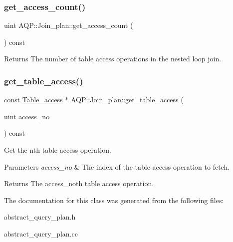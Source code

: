 \subsubsection{\texorpdfstring{get\+\_\+access\+\_\+count()}{get\_access\_count()}}
{\footnotesize\ttfamily uint A\+Q\+P\+::\+Join\+\_\+plan\+::get\+\_\+access\+\_\+count (\begin{DoxyParamCaption}{ }\end{DoxyParamCaption}) const\hspace{0.3cm}{\ttfamily [inline]}}

\begin{DoxyReturn}{Returns}
The number of table access operations in the nested loop join. 
\end{DoxyReturn}
\mbox{\label{classAQP_1_1Join__plan_aa9112ca023025f15a0b908f8cc519d18}} 
\subsubsection{\texorpdfstring{get\+\_\+table\+\_\+access()}{get\_table\_access()}}
{\footnotesize\ttfamily const \mbox{\hyperlink{classAQP_1_1Table__access}{Table\+\_\+access}} $\ast$ A\+Q\+P\+::\+Join\+\_\+plan\+::get\+\_\+table\+\_\+access (\begin{DoxyParamCaption}\item[{uint}]{access\+\_\+no }\end{DoxyParamCaption}) const\hspace{0.3cm}{\ttfamily [inline]}}

Get the n\textquotesingle{}th table access operation. 
\begin{DoxyParams}{Parameters}
{\em access\+\_\+no} & The index of the table access operation to fetch. \\
\hline
\end{DoxyParams}
\begin{DoxyReturn}{Returns}
The access\+\_\+no\textquotesingle{}th table access operation. 
\end{DoxyReturn}


The documentation for this class was generated from the following files\+:\begin{DoxyCompactItemize}
\item 
abstract\+\_\+query\+\_\+plan.\+h\item 
abstract\+\_\+query\+\_\+plan.\+cc\end{DoxyCompactItemize}
